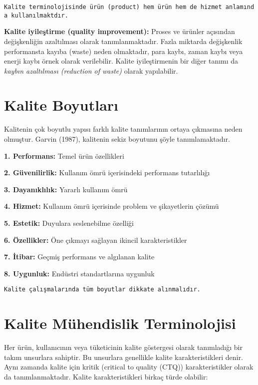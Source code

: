 \documentclass[
]{book}
\begin{document}
\texttt{Kalite\ terminolojisinde\ ürün\ (product)\ hem\ ürün\ hem\ de\ hizmet\ anlamında\ kullanılmaktdır.}

\textbf{Kalite iyileştirme (quality improvement):} Proses ve ürünler açısından değişkenliğin azaltılması olarak tanımlanmaktadır. Fazla miktarda değişkenlik performansta kayıba (waste) neden olmaktadır, para kaybı, zaman kaybı veya enerji kaybı örnek olarak verilebilir. Kalite iyileştirmenin bir diğer tanımı da \emph{kaybın azaltılması (reduction of waste)} olarak yapılabilir.

\hypertarget{kalite-boyutlarux131}{%
\section{Kalite Boyutları}\label{kalite-boyutlarux131}}

Kalitenin çok boyutlu yapısı farklı kalite tanımlarının ortaya çıkmasına neden olmuştur. Garvin (1987), kalitenin sekiz boyutunu şöyle tanımlamaktadır.

\textbf{1. Performans:} Temel ürün özellikleri

\textbf{2. Güvenilirlik:} Kullanım ömrü içerisindeki performans tutarlılığı

\textbf{3. Dayanıklılık:} Yararlı kullanım ömrü

\textbf{4. Hizmet:} Kullanım ömrü içerisinde problem ve şikayetlerin çözümü

\textbf{5. Estetik:} Duyulara seslenebilme özelliği

\textbf{6. Özellikler:} Öne çıkmayı sağlayan ikincil karakteristikler

\textbf{7. İtibar:} Geçmiş performans ve algılanan kalite

\textbf{8. Uygunluk:} Endüstri standartlarına uygunluk

\begin{verbatim}
Kalite çalışmalarında tüm boyutlar dikkate alınmalıdır.
\end{verbatim}

\hypertarget{kalite-muxfchendislik-terminolojisi}{%
\section{Kalite Mühendislik Terminolojisi}\label{kalite-muxfchendislik-terminolojisi}}

Her ürün, kullanıcının veya tüketicinin kalite göstergesi olarak tanımladığı bir takım unsurlara sahiptir. Bu unsurlara genellikle kalite karakteristikleri denir. Aynı zamanda kalite için kritik (critical to quality (CTQ)) karakteristikler olarak da tanımlanmaktadır. Kalite karakteristikleri birkaç türde olabilir:
\end{document}
